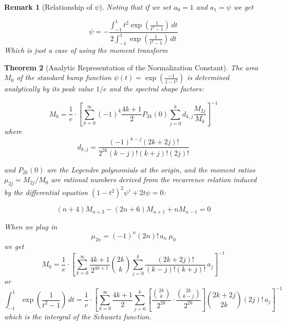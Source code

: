 \documentclass[11pt]{article}
\theoremstyle{breakdef}
\newtheorem{theorem}{Theorem}[section]
\newtheorem{remark}[theorem]{Remark}
\begin{document}
\begin{remark}[Relationship of $\psi$]
Noting that if we set $a_0 = 1$ and $a_1 = \psi$ we get

\begin{equation}
\psi = -\frac{\int_{-1}^1 t^2 \exp \left(\frac{1}{t^2-1}\right) \, dt}{2 \int_{-1}^1 \exp
   \left(\frac{1}{t^2-1}\right) \, dt}
\end{equation}
Which is just a case of using the moment transform
\end{remark}


\begin{theorem}[Analytic Representation of the Normalization Constant]
The area $M_0$ of the standard bump function $\psi(t) = \exp\left(\frac{-1}{1-t^2}\right)$ is determined analytically by its peak value $1/e$ and the spectral shape factors:

\begin{equation}
    M_0 = \frac{1}{e} \cdot \left[ \sum_{k=0}^{\infty} (-1)^k \frac{4k+1}{2} P_{2k}(0) \sum_{j=0}^{k} d_{k,j} \frac{M_{2j}}{M_0} \right]^{-1}
\end{equation}
where
\begin{equation}
    d_{k,j} = \frac{(-1)^{k-j} (2k+2j)!}{2^{2k} (k-j)! (k+j)! (2j)!}
\end{equation}

and $P_{2k}(0)$ are the Legendre polynomials at the origin, and the moment ratios $\mu_{2j} = M_{2j}/M_0$ are rational numbers derived from the recurrence relation induced by the differential equation $(1-t^2)^2 \psi' + 2t\psi = 0$:

\begin{equation}
    (n+4) M_{n+3} - (2n+6) M_{n+1} + n M_{n-1} = 0
\end{equation}

When we plug in 
\begin{equation}
    \mu_{2n} = (-1)^n (2n)! \, a_n \ \mu_{0}
\end{equation}
we get 
\begin{equation}
    M_0 = \frac{1}{e} \cdot \left[ \sum_{k=0}^{\infty} \frac{4k+1}{2^{4k+1}} \binom{2k}{k} \sum_{j=0}^{k} \frac{(2k+2j)!}{(k-j)! (k+j)!} \, a_j \right]^{-1}
\end{equation}
or 
\begin{equation}
\int_{-1}^{1}  \exp\left(\frac{1}{t^2 -1}\right)\, dt = \frac{1}{e} \cdot \left[ \sum_{k=0}^{\infty} \frac{4k+1}{2} \sum_{j=0}^{k} \left[ \frac{\binom{2k}{k}}{2^{2k}} \cdot \frac{\binom{2k}{k-j}}{2^{2k}} \right] \binom{2k+2j}{2k} (2j)! \, a_j \right]^{-1}
\end{equation}
which is the intergral of the Schwartz function.
 \cite{schwartz1950}
\end{theorem}
\end{document}
